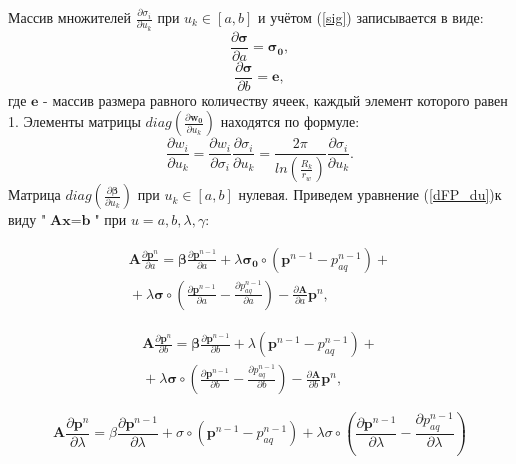 \documentclass[14pt]{article}
\begin{document}
Массив множителей $ \frac{\partial \sigma_i}{\partial u_k} $ при $ u_k \in [a,b]$ и учётом (\ref{sig}) записывается в виде:
\begin{equation*} \label{dsig_da}
\frac{\partial \boldsymbol{\sigma}}{\partial a} = \boldsymbol{\sigma_0},
\end{equation*}
\begin{equation*} \label{dsig_db}
\frac{\partial \boldsymbol{\sigma}}{\partial b} = \boldsymbol{e},
\end{equation*}
где $ \boldsymbol{e} $ - массив размера равного количеству ячеек, каждый элемент которого равен 1.
Элементы матрицы $ diag(\frac{\partial \boldsymbol{w_0}}{\partial u_k}) $ находятся по формуле:
\begin{equation} \label{dWI}
\frac{\partial w_i}{\partial u_k} = \frac{\partial w_i}{\partial \sigma_i}\frac{\partial \sigma_i}{\partial u_k} =  \frac{2 \pi}{ln\left(\frac{R_k}{r_w}\right)}\frac{\partial \sigma_i}{\partial u_k}.
\end{equation} 
Матрица $ diag(\frac{\partial \boldsymbol{\beta}}{\partial u_k}) $ при $ u_k \in [a,b]$ нулевая. Приведем уравнение (\ref{dFP_du})к виду "$\textbf{A}\textbf{x}=\textbf{b}$" при $u = a,b,\lambda,\gamma$:

\begin{multline} \label{eq_dp_da}
\boldsymbol{A}\frac{\partial \boldsymbol{p}^n}{\partial a} = \boldsymbol{\beta}\frac{\partial\boldsymbol{p}^{n-1}}{\partial a}
+ \lambda\boldsymbol{\sigma_0} \circ \left(\boldsymbol{p}^{n-1}-p_{aq}^{n-1}\right) +  {} \\
{} +\lambda\boldsymbol{\sigma} \circ \left(\frac{\partial \boldsymbol{p}^{n-1}}{\partial a}-\frac{\partial p_{aq}^{n-1}}{\partial a}\right)
-\frac{\partial \boldsymbol{A}}{\partial a}\boldsymbol{p}^n,
\end{multline}

\begin{multline} \label{eq_dp_db}
\boldsymbol{A}\frac{\partial \boldsymbol{p}^n}{\partial b} = \boldsymbol{\beta}\frac{\partial\boldsymbol{p}^{n-1}}{\partial b} + \lambda(\boldsymbol{p}^{n-1}-p_{aq}^{n-1}) +  {} \\
{} + \lambda\boldsymbol{\sigma} \circ \left(\frac{\partial \boldsymbol{p}^{n-1}}{\partial b}-\frac{\partial p_{aq}^{n-1}}{\partial b}\right)
-\frac{\partial\boldsymbol{A}}{\partial b}\boldsymbol{p}^n,
\end{multline}

\begin{equation} \label{eq_dp_dlam}
\boldsymbol{A}\frac{\partial \boldsymbol{p}^n}{\partial \lambda}
 = \beta\frac{\partial \boldsymbol{p}^{n-1}}{\partial \lambda} + \sigma \circ \left(\boldsymbol{p}^{n-1}-p_{aq}^{n-1}\right)
 +\lambda\sigma \circ \left(\frac{\partial \boldsymbol{p}^{n-1}}{\partial \lambda}
 -\frac{\partial p_{aq}^{n-1}}{\partial \lambda}\right)
\end{equation}
\end{document}
